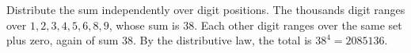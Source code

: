 Distribute the sum independently over digit positions. The thousands digit ranges over $1,2,3,4,5,6,8,9$, whose sum is $38$. Each other digit ranges over the same set plus zero, again of sum $38$. By the distributive law, the total is $38^4=\boxed{2085136}$.

